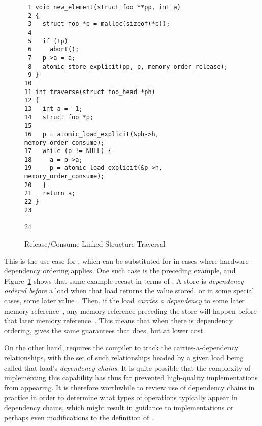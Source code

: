 \documentclass[letterpaper,twocolumn,10pt]{article}
\begin{document}
\begin{figure}[tbp]
{ \scriptsize
\begin{verbatim}
 1 void new_element(struct foo **pp, int a)
 2 {
 3   struct foo *p = malloc(sizeof(*p));
 4 
 5   if (!p)
 6     abort();
 7   p->a = a;
 8   atomic_store_explicit(pp, p, memory_order_release);
 9 }
10 
11 int traverse(struct foo_head *ph)
12 {
13   int a = -1;
14   struct foo *p;
15 
16   p = atomic_load_explicit(&ph->h, memory_order_consume);
17   while (p != NULL) {
18     a = p->a;
19     p = atomic_load_explicit(&p->n, memory_order_consume);
20   }
21   return a;
22 }
23 \end{verbatim}
24 }
\caption{Release/Consume Linked Structure Traversal}
\label{fig:Release/Consume Linked Structure Traversal}
\end{figure}

This is the use case for , which can
be substituted for  in cases where
hardware dependency ordering applies.
One such case is the preceding example, and
Figure~\ref{fig:Release/Consume Linked Structure Traversal}
shows that same example recast in terms of .
A  store is \emph{dependency ordered before}
a  load when that load returns the value
stored, or in some special cases, some later
value~\cite[1.10p12]{RichardSmith2015N4527}.
Then, if the load \emph{carries a dependency} to some later
memory reference~\cite[1.10p11]{RichardSmith2015N4527},
any memory reference preceding the 
store will happen before that later memory
reference~\cite[1.10p11-1.10p14]{RichardSmith2015N4527}.
This means that when there is dependency ordering,
 gives the same guarantees that
 does, but at lower cost.

On the other hand,  requires the compiler
to track the carries-a-dependency relationships, with the
set of such relationships headed by a given 
load being called that load's \emph{dependency chains}.
It is quite possible that the complexity of implementing this
capability has thus far prevented high-quality 
implementations from appearing.
It is therefore worthwhile to review use of dependency chains in
practice in order to determine what types of operations typically
appear in dependency chains, which might result in guidance to
implementations or perhaps even modifications to the definition of
.
\end{document}
